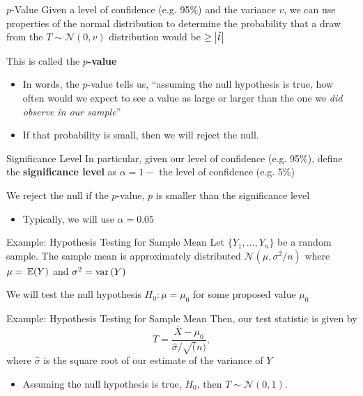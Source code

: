\documentclass[aspectratio=169,t,11pt,table]{beamer}
\begin{document}
\begin{frame}{$p$-Value}
  Given a level of confidence (e.g. 95\%) and the variance $v$, we can use properties of the normal distribution to determine the probability that a draw from the $T \sim \mathcal{N}(0, v)$ distribution would be $\geq \left\lvert \hat{t} \right\rvert$
  
  \bigskip
  This is called the \textbf{$p$-value}
  \begin{itemize}
    \item In words, the $p$-value tells us, ``assuming the null hypothesis is true, how often would we expect to see a value as large or larger than the one we \emph{did observe in our sample}'' 
  
    \item If that probability is small, then we will reject the null.
  \end{itemize}
\end{frame}

\begin{frame}{Significance Level}
  In particular, given our level of confidence (e.g. 95\%), define the \textbf{significance level} as $\alpha = 1 -$ the level of confidence (e.g. 5\%)
  
  \bigskip
  We reject the null if the $p$-value, $p$ is smaller than the significance level
  \begin{itemize}
    \item Typically, we will use $\alpha = 0.05$
  \end{itemize}
\end{frame}

\begin{frame}{Example: Hypothesis Testing for Sample Mean}
  Let $\{ Y_1, \dots, Y_n \}$ be a random sample. The sample mean is approximately distributed $\mathcal{N}(\mu, \sigma^2 / n)$ where $\mu = \expec{Y}$ and $\sigma^2 = \var{Y}$
  
  \bigskip
  We will test the null hypothesis $H_0: \mu = \mu_0$ for some proposed value $\mu_0$
\end{frame}

\begin{frame}{Example: Hypothesis Testing for Sample Mean}
  Then, our test statistic is given by 
  $$
    T = \frac{\bar{X} - \mu_0}{\hat{\sigma} / \sqrt(n)},
  $$
  where $\hat{\sigma}$ is the square root of our estimate of the variance of $Y$
  \begin{itemize}
    \item Assuming the null hypothesis is true, $H_0$, then $T \sim \mathcal{N}(0, 1)$.
  \end{itemize}
\end{frame}
\end{document}
